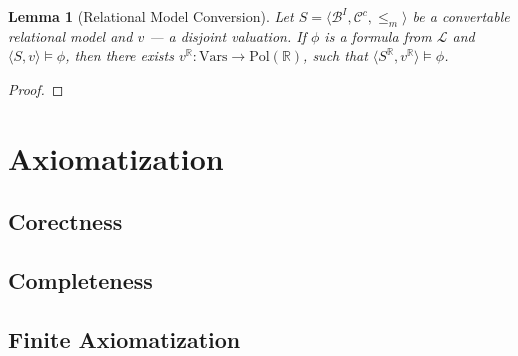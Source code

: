 \documentclass{article}
\newtheorem*{lemma}{Lemma}
\newcommand{\R}{\mathbb{R}}
\newcommand{\B}{\mathcal{B}}
\newcommand{\lang}{\mathcal{L}}
\newcommand{\Vars}{\text{Vars}}
\newcommand{\Pol}{\text{Pol}}
\begin{document}
\begin{lemma}[Relational Model Conversion]
  Let $S = \langle \B^I, \mathcal{C}^c, \leq_m \rangle$ be a convertable relational model and $v$ --- a disjoint valuation. If $\phi$ is a formula from $\lang$ and $\langle S, v \rangle \models \phi$, then there exists $v^\R: \Vars \rightarrow \Pol(\R)$, such that $\langle S^\R, v^\R \rangle \models \phi$.
\end{lemma}
\begin{proof}
\end{proof}
\section{Axiomatization}
\subsection{Corectness}
\subsection{Completeness}
\subsection{Finite Axiomatization}
\end{document}
